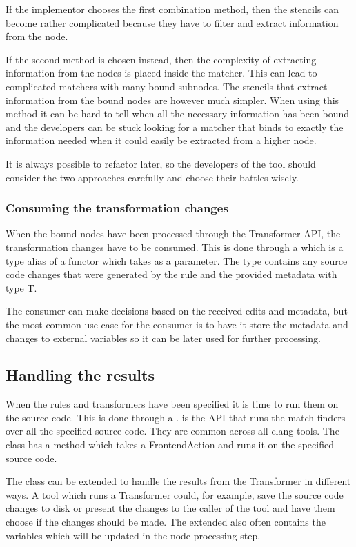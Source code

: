 If the implementor chooses the first combination method, then the stencils can become rather complicated because they have to filter and extract information from the node. 

If the second method is chosen instead, then the complexity of extracting information from the nodes is placed inside the matcher. This can lead to complicated matchers with many bound subnodes. The stencils that extract information from the bound nodes are however much simpler. When using this method it can be hard to tell when all the necessary information has been bound and the developers can be stuck looking for a matcher that binds to exactly the information needed when it could easily be extracted from a higher node.

It is always possible to refactor later, so the developers of the tool should consider the two approaches carefully and choose their battles wisely.

\subsubsection*{Consuming the transformation changes} \label{subsubsec:080dev:Consumers}

When the bound nodes have been processed through the Transformer API, the transformation changes have to be consumed. This is done through a  which is a type alias of a functor which takes  as a parameter. The  type contains any source code changes that were generated by the rule and the provided metadata with type T.

The consumer can make decisions based on the received edits and metadata, but the most common use case for the consumer is to have it store the metadata and changes to external variables so it can be later used for further processing.

\subsection{Handling the results} \label{subsec:080dev:HandlingToolResults}

When the rules and transformers have been specified it is time to run them on the source code. This is done through a .  is the API that runs the match finders over all the specified source code. They are common across all clang tools. The  class has a  method which takes a FrontendAction and runs it on the specified source code. 

The  class can be extended to handle the results from the Transformer in different ways. A tool which runs a Transformer could, for example, save the source code changes to disk or present the changes to the caller of the tool and have them choose if the changes should be made. The extended  also often contains the variables which will be updated in the node processing step.